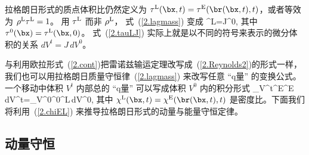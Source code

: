 拉格朗日形式的质点体积比仍然定义为
$\tau^{\rm L}(\bx,t)=\tau^{\rm E}(\br(\bx,t),t)$，或者等效为
$\rho^{\rm L}\tau^{\rm L}=1$。
用 $\tau^{\rm L}$ 而非 $\rho^{\rm L}$，
式~(\ref{2.lagmass}) 变成
\eq
\label{2.tauLJ}
\tau^{\rm L}=J\tau^0,
\en
其中 $\tau^0(\bx)=\tau^{\rm L}(\bx,0)$。
式~(\ref{2.tauLJ}) 实际上就是以不同的符号来表示的微分体积的关系 $dV^t=J\,dV^0$。

与利用欧拉形式~(\ref{2.cont})把雷诺兹输运定理改写成~(\ref{2.Reynolds2})的形式一样，
我们也可以用拉格朗日质量守恒律~(\ref{2.lagmass})
来改写任意 ``q量'' 的变换公式。
%
一个移动中体积 $V^t$ 内部总的
``q量'' 可以写成体积 $V^0$ 内的积分形式
\eq
\label{2.chiEL}
\int_{V^t}\rho^{\rm E}\chi^{\rm E}\,dV^t=\int_{V^0}\rho^0\chi^{\rm L}\,dV^0,
\en
其中 $\chi^{\rm L}(\bx,t)=\chi^{\rm E}(\br(\bx,t),t)$ 是密度比。下面我们将利用~(\ref{2.chiEL}) 来推导拉格朗日形式的动量与能量守恒定律。
%
%

\subsection{动量守恒}
%
%

